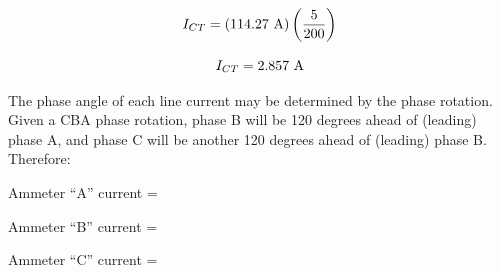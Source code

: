 $$I_{CT} = (114.27 \hbox{ A})\left(5 \over 200 \right)$$

$$I_{CT} = 2.857 \hbox{ A}$$

The phase angle of each line current may be determined by the phase rotation.  Given a CBA phase rotation, phase B will be 120 degrees ahead of (leading) phase A, and phase C will be another 120 degrees ahead of (leading) phase B.  Therefore:

\vskip 10pt

Ammeter ``A'' current = 

\vskip 10pt

Ammeter ``B'' current = 

\vskip 10pt

Ammeter ``C'' current = 

\vskip 10pt










